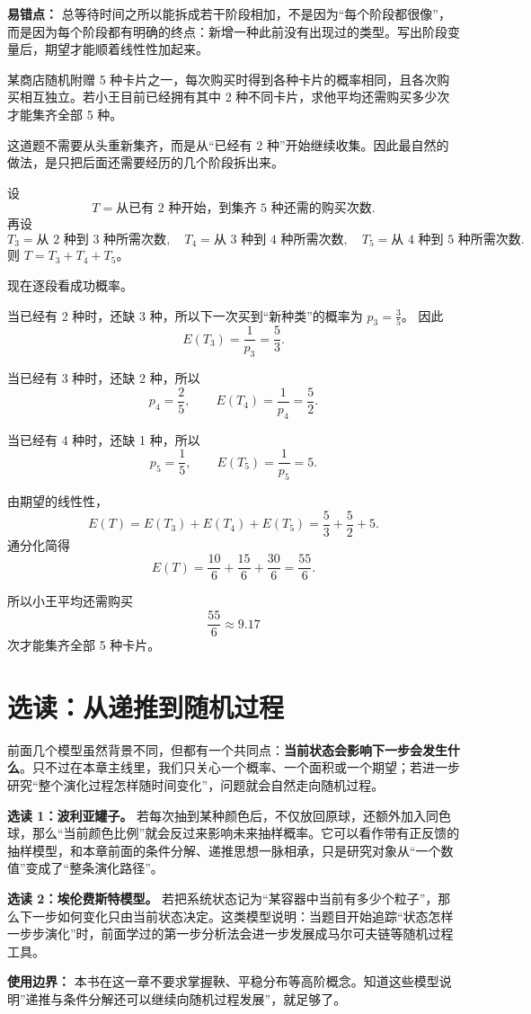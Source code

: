 ﻿\documentclass[lang=cn,11pt]{elegantbook}
\begin{document}
\begin{note}
\textbf{易错点：} 总等待时间之所以能拆成若干阶段相加，不是因为“每个阶段都很像”，而是因为每个阶段都有明确的终点：新增一种此前没有出现过的类型。写出阶段变量后，期望才能顺着线性性加起来。
\end{note}

\begin{exercise}[已有部分收藏时的优惠券收集]\label{ex:coupon_partial}
某商店随机附赠 5 种卡片之一，每次购买时得到各种卡片的概率相同，且各次购买相互独立。若小王目前已经拥有其中 2 种不同卡片，求他平均还需购买多少次才能集齐全部 5 种。
\end{exercise}

\begin{solution}
这道题不需要从头重新集齐，而是从“已经有 2 种”开始继续收集。因此最自然的做法，是只把后面还需要经历的几个阶段拆出来。

设
\[
T=\text{从已有 2 种开始，到集齐 5 种还需的购买次数}.
\]
再设
\[
T_3=\text{从 2 种到 3 种所需次数},\quad
T_4=\text{从 3 种到 4 种所需次数},\quad
T_5=\text{从 4 种到 5 种所需次数}.
\]
则 \(T=T_3+T_4+T_5\)。

现在逐段看成功概率。

当已经有 2 种时，还缺 3 种，所以下一次买到“新种类”的概率为 \(p_3=\frac35\)。
因此
\[
E(T_3)=\frac{1}{p_3}=\frac53.
\]

当已经有 3 种时，还缺 2 种，所以
\[
p_4=\frac25,\qquad E(T_4)=\frac{1}{p_4}=\frac52.
\]

当已经有 4 种时，还缺 1 种，所以
\[
p_5=\frac15,\qquad E(T_5)=\frac{1}{p_5}=5.
\]

由期望的线性性，
\[
E(T)=E(T_3)+E(T_4)+E(T_5)=\frac53+\frac52+5.
\]
通分化简得
\[
E(T)=\frac{10}{6}+\frac{15}{6}+\frac{30}{6}=\frac{55}{6}.
\]

所以小王平均还需购买
\[
\frac{55}{6}\approx 9.17
\]
次才能集齐全部 5 种卡片。
\end{solution}

\section{选读：从递推到随机过程}

前面几个模型虽然背景不同，但都有一个共同点：\textbf{当前状态会影响下一步会发生什么}。只不过在本章主线里，我们只关心一个概率、一个面积或一个期望；若进一步研究“整个演化过程怎样随时间变化”，问题就会自然走向随机过程。

\begin{note}
\textbf{选读 1：波利亚罐子。} 若每次抽到某种颜色后，不仅放回原球，还额外加入同色球，那么“当前颜色比例”就会反过来影响未来抽样概率。它可以看作带有正反馈的抽样模型，和本章前面的条件分解、递推思想一脉相承，只是研究对象从“一个数值”变成了“整条演化路径”。

\textbf{选读 2：埃伦费斯特模型。} 若把系统状态记为“某容器中当前有多少个粒子”，那么下一步如何变化只由当前状态决定。这类模型说明：当题目开始追踪“状态怎样一步步演化”时，前面学过的第一步分析法会进一步发展成马尔可夫链等随机过程工具。

\textbf{使用边界：} 本书在这一章不要求掌握鞅、平稳分布等高阶概念。知道这些模型说明”递推与条件分解还可以继续向随机过程发展”，就足够了。
\end{note}
\end{document}
